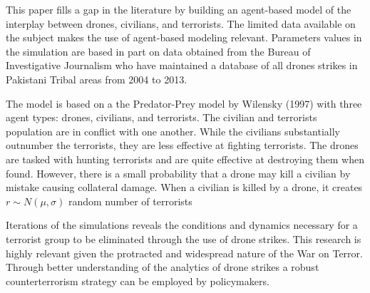 \documentclass[12pt,letter,draft]{article}
\begin{document}
\begin{spacing}{1.5}
This paper fills a gap in the literature by building an agent-based model of the interplay between drones, civilians, and terrorists. The limited data available on the subject makes the use of agent-based modeling relevant. Parameters values in the simulation are based in part on data obtained from the Bureau of Investigative Journalism who have maintained a database of all drones strikes in Pakistani Tribal areas from 2004 to 2013. 

The model is based on a the Predator-Prey model by Wilensky (1997) with three agent types: drones, civilians, and terrorists. The civilian and terrorists population are in conflict with one another. While the civilians substantially outnumber the terrorists, they are less effective at fighting terrorists. The drones are tasked with hunting terrorists and are quite effective at destroying them when found. However, there is a small probability that a drone may kill a civilian by mistake causing collateral damage. When a civilian is killed by a drone, it creates $r\sim N(\mu,\sigma)$ random number of terrorists   

 

Iterations of the simulations reveals the conditions and dynamics necessary for a terrorist group to be eliminated through the use of drone strikes. This research is highly relevant given the protracted and widespread nature of the War on Terror. Through better understanding of the analytics of drone strikes a robust counterterrorism strategy can be employed by policymakers. 





\end{spacing}
\end{document}
